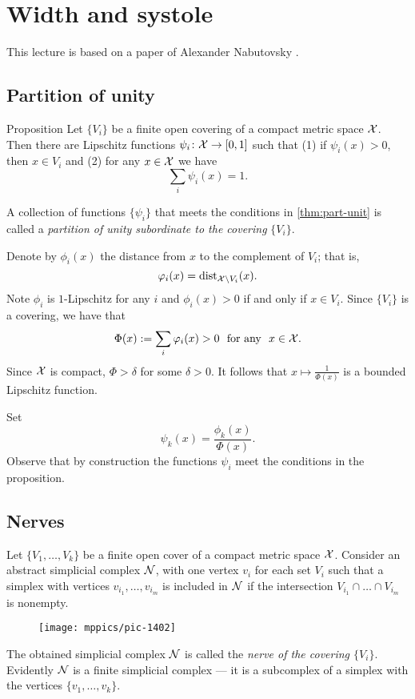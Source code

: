 \chapter{Width and systole}

This lecture is based on a paper of Alexander Nabutovsky \cite{nabutovsky}.

\section{Partition of unity}

\begin{thm}{Proposition}\label{thm:part-unit}
 Let $\{V_i\}$ be a finite open covering of a compact metric space ${\mathcal{X}}$.
Then there are Lipschitz functions $\psi_i\:{\spc{X}}\z\to[0,1]$ such that (1) if $\psi_i(x)>0$, then $x\in V_i$ and (2) for any $x\in {\mathcal{X}}$ we have
$$\sum_i\psi_i(x)=1.$$

\end{thm}

A collection of functions $\{\psi_i\}$ that meets the conditions in \ref{thm:part-unit} is called 
a \emph{partition of unity subordinate to the covering} $\{V_i\}$.

Denote by $\phi_i(x)$ the distance from $x$ to the complement of $V_i$;
that is,
$$\varphi_i(x)=\mathrm{dist}_{{\mathcal{X}}\backslash V_i}(x).$$
Note $\phi_i$ is $1$-Lipschitz
for any $i$
and $\phi_i(x)>0$ if and only if $x\in V_i$.
Since $\{V_i\}$ is a covering, we have that
$$\Phi(x)\df\sum_i\phi_i(x)>0\ \ \text{for any}\ \ x\in {\spc{X}}.$$
Since $\mathcal{X}$ is compact, $\Phi>\delta$ for some $\delta>0$.
It follows that $x\mapsto\tfrac1{\Phi(x)}$ is a bounded Lipschitz function. 

Set 
$$\psi_k(x)=\frac{\phi_k(x)}{\Phi(x)}.$$
Observe that by construction the functions $\psi_i$ meet the conditions in the proposition.
\qedsf

\section{Nerves}

Let $\{V_1,\dots,V_k\}$ be a finite open cover of a compact metric space $\mathcal{X}$.
Consider an abstract simplicial complex $\mathcal{N}$, with one vertex $v_i$ for each set $V_i$ such that a simplex with vertices $v_{i_1},\dots, v_{i_m}$ is included in $\mathcal{N}$ if 
the intersection $V_{i_1}\cap\dots\cap V_{i_m}$ is nonempty.
\begin{figure}[h!]
\vskip-0mm
\centering
\texttt{[image: mppics/pic-1402]}
\end{figure}
The obtained simplicial complex $\mathcal{N}$ is called the \emph{nerve of the covering $\{V_i\}$}.
Evidently $\mathcal{N}$ is a finite simplicial complex ---
it is a subcomplex of a simplex with the vertices $\{v_1,\dots,v_k\}$.

